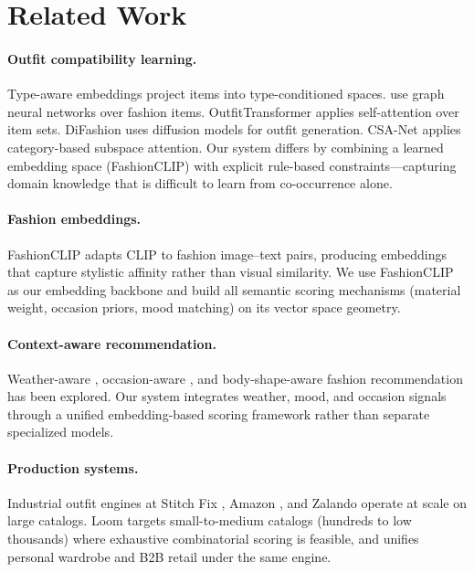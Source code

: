 \documentclass[10pt,twocolumn]{article}
\begin{document}
\section{Related Work}
\label{sec:related}

\paragraph{Outfit compatibility learning.}
Type-aware embeddings \citep{vasileva2018learning} project items into
type-conditioned spaces.  \citet{cui2019dressing} use graph neural networks
over fashion items.  OutfitTransformer \citep{sarkar2023outfittransformer}
applies self-attention over item sets.  DiFashion \citep{xu2024difashion}
uses diffusion models for outfit generation.  CSA-Net \citep{lin2020csanet}
applies category-based subspace attention.  Our system differs by combining
a learned embedding space (FashionCLIP) with explicit rule-based
constraints---capturing domain knowledge that is difficult to learn from
co-occurrence alone.

\paragraph{Fashion embeddings.}
FashionCLIP \citep{chia2022fashionclip} adapts CLIP \citep{radford2021clip}
to fashion image--text pairs, producing embeddings that capture stylistic
affinity rather than visual similarity.  We use FashionCLIP as our embedding
backbone and build all semantic scoring mechanisms (material weight, occasion
priors, mood matching) on its vector space geometry.

\paragraph{Context-aware recommendation.}
Weather-aware \citep{chen2019weather}, occasion-aware
\citep{lin2020occasion}, and body-shape-aware \citep{hidayati2021dress}
fashion recommendation has been explored.  Our system integrates weather,
mood, and occasion signals through a unified embedding-based scoring
framework rather than separate specialized models.

\paragraph{Production systems.}
Industrial outfit engines at Stitch Fix \citep{chen2019stitchfix}, Amazon
\citep{kang2017visually}, and Zalando operate at scale on large catalogs.
Loom targets small-to-medium catalogs (hundreds to low thousands) where
exhaustive combinatorial scoring is feasible, and unifies personal wardrobe
and B2B retail under the same engine.
\end{document}
